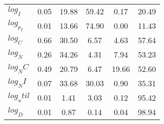 \begin{center}
\begin{longtable}{lccccc}
$log_I     $	 & 	        0.05	 & 	       19.88	 & 	       59.42	 & 	        0.17	 & 	       20.49 \\ 
$log_p_I   $	 & 	        0.01	 & 	       13.66	 & 	       74.90	 & 	        0.00	 & 	       11.43 \\ 
$log_C     $	 & 	        0.66	 & 	       30.50	 & 	        6.57	 & 	        4.63	 & 	       57.64 \\ 
$log_N     $	 & 	        0.26	 & 	       34.26	 & 	        4.31	 & 	        7.94	 & 	       53.23 \\ 
$log_NC    $	 & 	        0.49	 & 	       20.79	 & 	        6.47	 & 	       19.66	 & 	       52.60 \\ 
$log_NI    $	 & 	        0.07	 & 	       33.68	 & 	       30.03	 & 	        0.90	 & 	       35.31 \\ 
$log_util  $	 & 	        0.01	 & 	        1.41	 & 	        3.03	 & 	        0.12	 & 	       95.42 \\ 
$log_D     $	 & 	        0.01	 & 	        0.87	 & 	        0.14	 & 	        0.04	 & 	       98.94 \\ 
\end{longtable}
 \end{center}
